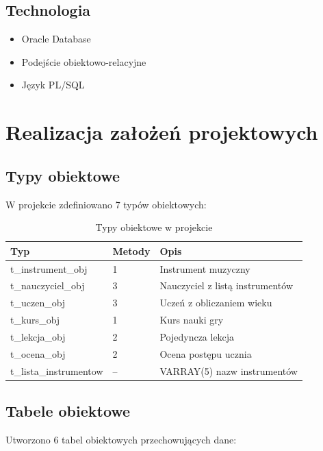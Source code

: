 \documentclass[12pt,a4paper]{article}
\begin{document}
\subsection{Technologia}
\begin{itemize}[nosep]
    \item Oracle Database
    \item Podejście obiektowo-relacyjne
    \item Język PL/SQL
\end{itemize}

\section{Realizacja założeń projektowych}

\subsection{Typy obiektowe}
W projekcie zdefiniowano 7 typów obiektowych:

\begin{table}[h]
\centering
\begin{tabular}{|l|l|p{6cm}|}
\hline
\textbf{Typ} & \textbf{Metody} & \textbf{Opis} \\
\hline
t\_instrument\_obj & 1 & Instrument muzyczny \\
t\_nauczyciel\_obj & 3 & Nauczyciel z listą instrumentów \\
t\_uczen\_obj & 3 & Uczeń z obliczaniem wieku \\
t\_kurs\_obj & 1 & Kurs nauki gry \\
t\_lekcja\_obj & 2 & Pojedyncza lekcja \\
t\_ocena\_obj & 2 & Ocena postępu ucznia \\
t\_lista\_instrumentow & -- & VARRAY(5) nazw instrumentów \\
\hline
\end{tabular}
\caption{Typy obiektowe w projekcie}
\end{table}

\subsection{Tabele obiektowe}
Utworzono 6 tabel obiektowych przechowujących dane:
\end{document}
